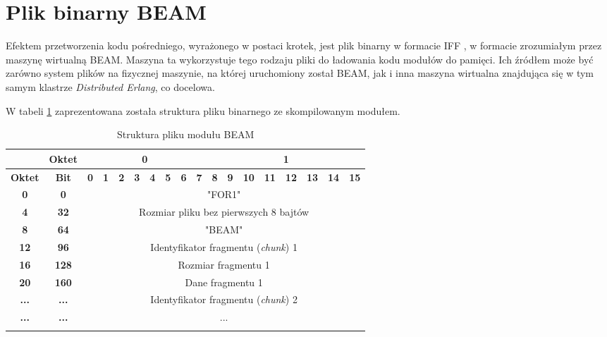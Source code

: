 \section{Plik binarny BEAM}

Efektem przetworzenia kodu pośredniego, wyrażonego w postaci krotek, jest plik binarny w formacie IFF \cite{morrison1985ea}, w formacie zrozumiałym przez maszynę wirtualną BEAM. Maszyna ta wykorzystuje tego rodzaju pliki do ładowania kodu modułów do pamięci. Ich źródłem może być zarówno system plików na fizycznej maszynie, na której uruchomiony został BEAM, jak i inna maszyna wirtualna znajdująca się w tym samym klastrze \emph{Distributed Erlang}, co docelowa.

W tabeli \ref{table:beamFile} zaprezentowana została struktura pliku binarnego ze skompilowanym modułem.

\begin{longtable}{|c|c|c|c|c|c|c|c|c|c|c|c|c|c|c|c|c|c|}
\hline
         & \textbf{Oktet} & \multicolumn{8}{|c|}{\textbf{0}} & \multicolumn{8}{|c|}{\textbf{1}} \\
\hline
\textbf{Oktet} & \textbf{Bit} & \textbf{0} & \textbf{1} & \textbf{2} & \textbf{3} & \textbf{4} & \textbf{5} & \textbf{6} & \textbf{7} & \textbf{8} & \textbf{9} & \textbf{10} & \textbf{11} & \textbf{12} & \textbf{13} & \textbf{14} & \textbf{15}\\
\hline
\textbf{0} & \textbf{0} & \multicolumn{16}{|c|}{"FOR1"} \\[3ex]
\hline
\textbf{4} & \textbf{32} & \multicolumn{16}{|c|}{Rozmiar pliku bez pierwszych 8 bajtów}\\[3ex]
\hline
\textbf{8} & \textbf{64} & \multicolumn{16}{|c|}{"BEAM"} \\[3ex]
\hline
\textbf{12} & \textbf{96} & \multicolumn{16}{|c|}{Identyfikator fragmentu (\emph{chunk}) 1}\\[3ex]
\hline
\textbf{16} & \textbf{128} & \multicolumn{16}{|c|}{Rozmiar fragmentu 1} \\[3ex]
\hline
\textbf{20} & \textbf{160} & \multicolumn{16}{|c|}{Dane fragmentu 1} \\[10ex]
\hline
\textbf{...} & \textbf{...} & \multicolumn{16}{|c|}{Identyfikator fragmentu (\emph{chunk}) 2}\\[3ex]
\hline
\textbf{...} & \textbf{...} & \multicolumn{16}{|c|}{...} \\[10ex]
\hline
\caption{Struktura pliku modułu BEAM}
\label{table:beamFile} \\
\end{longtable}

